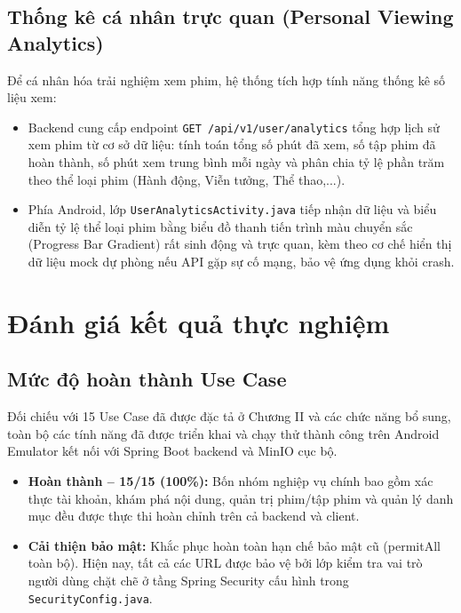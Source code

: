 \subsection{Thống kê cá nhân trực quan (Personal Viewing Analytics)}
\label{subsec:user_analytics}

Để cá nhân hóa trải nghiệm xem phim, hệ thống tích hợp tính năng thống kê số liệu xem:
\begin{itemize}
    \item Backend cung cấp endpoint \texttt{GET /api/v1/user/analytics} tổng hợp lịch sử xem phim từ cơ sở dữ liệu: tính toán tổng số phút đã xem, số tập phim đã hoàn thành, số phút xem trung bình mỗi ngày và phân chia tỷ lệ phần trăm theo thể loại phim (Hành động, Viễn tưởng, Thể thao,...).
    \item Phía Android, lớp \texttt{UserAnalyticsActivity.java} tiếp nhận dữ liệu và biểu diễn tỷ lệ thể loại phim bằng biểu đồ thanh tiến trình màu chuyển sắc (Progress Bar Gradient) rất sinh động và trực quan, kèm theo cơ chế hiển thị dữ liệu mock dự phòng nếu API gặp sự cố mạng, bảo vệ ứng dụng khỏi crash.
\end{itemize}


\section{Đánh giá kết quả thực nghiệm}
\label{sec:danh_gia_thuc_nghiem}

\subsection{Mức độ hoàn thành Use Case}
\label{subsec:muc_do_hoan_thanh}

Đối chiếu với 15 Use Case đã được đặc tả ở Chương II và các chức năng bổ sung, toàn bộ các tính năng đã được triển khai và chạy thử thành công trên Android Emulator kết nối với Spring Boot backend và MinIO cục bộ.

\begin{itemize}
    \item \textbf{Hoàn thành -- 15/15 (100\%):} Bốn nhóm nghiệp vụ chính bao gồm xác thực tài khoản, khám phá nội dung, quản trị phim/tập phim và quản lý danh mục đều được thực thi hoàn chỉnh trên cả backend và client.
    \item \textbf{Cải thiện bảo mật:} Khắc phục hoàn toàn hạn chế bảo mật cũ (permitAll toàn bộ). Hiện nay, tất cả các URL được bảo vệ bởi lớp kiểm tra vai trò người dùng chặt chẽ ở tầng Spring Security cấu hình trong \texttt{SecurityConfig.java}.
\end{itemize}

